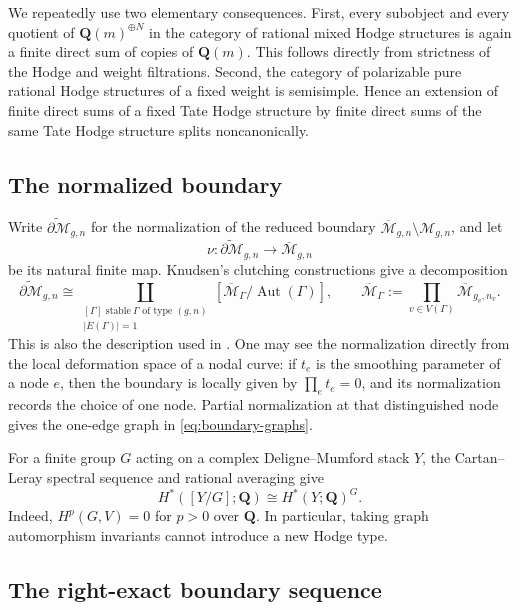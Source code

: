 \documentclass[12pt,reqno]{amsart}
\newcommand{\Q}{\mathbf{Q}}
\newcommand{\M}{\mathcal{M}}
\newcommand{\Mbar}{\overline{\mathcal{M}}}
\newcommand{\Aut}{\operatorname{Aut}}
\theoremstyle{definition}
\theoremstyle{remark}
\begin{document}
We repeatedly use two elementary consequences.  First, every subobject and
every quotient of $\Q(m)^{\oplus N}$ in the category of rational mixed Hodge
structures is again a finite direct sum of copies of $\Q(m)$.  This follows
directly from strictness of the Hodge and weight filtrations.  Second, the
category of polarizable pure rational Hodge structures of a fixed weight is
semisimple.  Hence an extension of finite direct sums of a fixed Tate Hodge
structure by finite direct sums of the same Tate Hodge structure splits
noncanonically.

\subsection{The normalized boundary}

Write $\widetilde{\partial\M}_{g,n}$ for the normalization of the reduced
boundary $\Mbar_{g,n}\setminus\M_{g,n}$, and let
\[
  \nu\colon\widetilde{\partial\M}_{g,n}\longrightarrow\Mbar_{g,n}
\]
be its natural finite map.  Knudsen's clutching constructions
\cite{Knudsen} give a decomposition
\begin{equation}\label{eq:boundary-graphs}
 \widetilde{\partial\M}_{g,n}
 \cong
 \coprod_{\substack{[\Gamma]\text{ stable}\
                     \Gamma\text{ of type }(g,n)\\ |E(\Gamma)|=1}}
 \left[\Mbar_\Gamma/\Aut(\Gamma)\right],
 \qquad
 \Mbar_\Gamma:=\prod_{v\in V(\Gamma)}
                  \Mbar_{g_v,n_v}.
\end{equation}
This is also the description used in
\cite[Section~2.1]{CLP}.  One may see the normalization directly from the
local deformation space of a nodal curve: if $t_e$ is the smoothing
parameter of a node $e$, then the boundary is locally given by
$\prod_e t_e=0$, and its normalization records the choice of one node.
Partial normalization at that distinguished node gives the one-edge graph
in \eqref{eq:boundary-graphs}.

For a finite group $G$ acting on a complex Deligne--Mumford stack $Y$, the
Cartan--Leray spectral sequence and rational averaging give
\begin{equation}\label{eq:quotient-invariants}
  H^*([Y/G];\Q)\cong H^*(Y;\Q)^G.
\end{equation}
Indeed, $H^p(G,V)=0$ for $p>0$ over $\Q$.  In particular, taking graph
automorphism invariants cannot introduce a new Hodge type.

\subsection{The right-exact boundary sequence}
\end{document}
